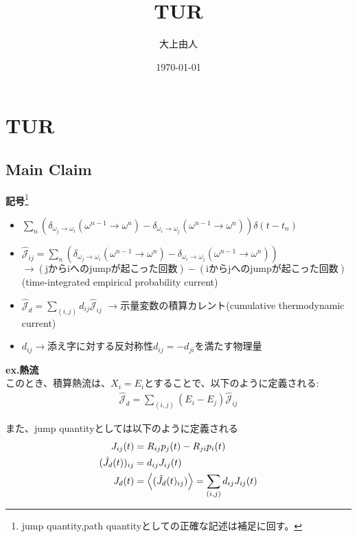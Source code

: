 \documentclass[a4paper,11pt]{jsarticle}
\numberwithin{equation}{section}
\begin{document}
\title{TUR}
\author{大上由人}
\date{\today}
\maketitle

\section{TUR}
\subsection{Main Claim}
\textbf{記号}\footnote{jump quantity,path quantityとしての正確な記述は補足に回す。}
\begin{itemize}
    \item $\sum_{n} (\delta_{\omega_j \to \omega_i}(\omega^{n-1}\to \omega^n) - \delta_{\omega_i \to \omega_j}(\omega^{n-1}\to \omega^n)) \delta(t-t_n)$\\
    \item $\hat{\mathcal{J}}_{ij} = \sum_{n} (\delta_{\omega_j \to \omega_i}(\omega^{n-1}\to \omega^n) - \delta_{\omega_i \to \omega_j}(\omega^{n-1}\to \omega^n))$\\
$\to (\text{jからiへのjumpが起こった回数})-(\text{iからjへのjumpが起こった回数})$(time-integrated empirical probability current)\\
    \item $\hat{\mathcal{J}}_{d} = \sum_{(i,j)} d_{ij} \hat{\mathcal{J}}_{ij}$
$\to$示量変数の積算カレント(cumulative thermodynamic current)
    \item $d_{ij}\to$添え字に対する反対称性$d_{ij} = -d_{ji}$を満たす物理量
\end{itemize}

\textbf{ex.熱流}\\
このとき、積算熱流は、$X_i = E_i$とすることで、以下のように定義される:
\begin{align}
    \hat{\mathcal{J}}_{d} = \sum_{(i,j)} (E_i - E_j) \hat{\mathcal{J}}_{ij}
\end{align}

また、jump quantityとしては以下のように定義される\\
\begin{align}
    {J}_{ij}(t) &= R_{ij}p_j(t) - R_{ji}p_i(t)\\
    (\hat{J}_{d}(t))_{ij} &= d_{ij} {J}_{ij}(t)\\
    J_{d}(t) &= \ev{(\hat{J}_{d}(t)_{ij})} = \sum_{(i,j)} d_{ij} {J}_{ij}(t)
\end{align}
\end{document}
